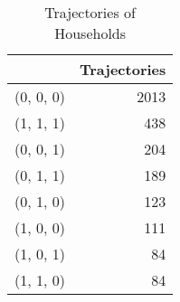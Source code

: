 \begin{table}
\centering
\caption{Trajectories of Households}
\label{tbl:Trajectories}
\begin{tabular}{lr}
\toprule
{} &  Trajectories \\
\midrule
(0, 0, 0) &          2013 \\
(1, 1, 1) &           438 \\
(0, 0, 1) &           204 \\
(0, 1, 1) &           189 \\
(0, 1, 0) &           123 \\
(1, 0, 0) &           111 \\
(1, 0, 1) &            84 \\
(1, 1, 0) &            84 \\
\bottomrule
\end{tabular}
\end{table}
